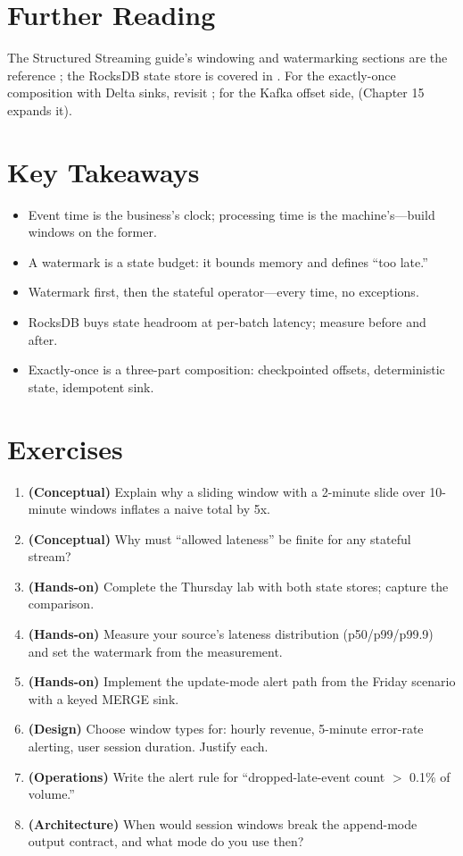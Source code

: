 \section{Further Reading}
The Structured Streaming guide's windowing and watermarking sections are the reference \cite{sparkStructuredStreaming}; the RocksDB state store is covered in \cite{databricksRocksDB}. For the exactly-once composition with Delta sinks, revisit \cite{databricksDelta}; for the Kafka offset side, \cite{sparkKafkaIntegration} (Chapter 15 expands it).

\section*{Key Takeaways}
\begin{itemize}
    \item Event time is the business's clock; processing time is the machine's---build windows on the former.
    \item A watermark is a state budget: it bounds memory and defines ``too late.''
    \item Watermark first, then the stateful operator---every time, no exceptions.
    \item RocksDB buys state headroom at per-batch latency; measure before and after.
    \item Exactly-once is a three-part composition: checkpointed offsets, deterministic state, idempotent sink.
\end{itemize}

\section{Exercises}
\begin{enumerate}
    \item \textbf{(Conceptual)} Explain why a sliding window with a 2-minute slide over 10-minute windows inflates a naive total by 5x.
    \item \textbf{(Conceptual)} Why must ``allowed lateness'' be finite for any stateful stream?
    \item \textbf{(Hands-on)} Complete the Thursday lab with both state stores; capture the comparison.
    \item \textbf{(Hands-on)} Measure your source's lateness distribution (p50/p99/p99.9) and set the watermark from the measurement.
    \item \textbf{(Hands-on)} Implement the update-mode alert path from the Friday scenario with a keyed MERGE sink.
    \item \textbf{(Design)} Choose window types for: hourly revenue, 5-minute error-rate alerting, user session duration. Justify each.
    \item \textbf{(Operations)} Write the alert rule for ``dropped-late-event count $>$ 0.1\% of volume.''
    \item \textbf{(Architecture)} When would session windows break the append-mode output contract, and what mode do you use then?
\end{enumerate}
